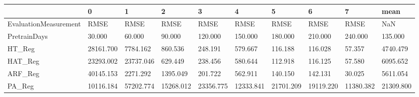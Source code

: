 \begin{tabular}{llllllllll}
\toprule
{} &         0 &         1 &         2 &         3 &         4 &         5 &         6 &         7 &      mean \\
\midrule
EvaluationMeasurement &      RMSE &      RMSE &      RMSE &      RMSE &      RMSE &      RMSE &      RMSE &      RMSE &       NaN \\
PretrainDays          &    30.000 &    60.000 &    90.000 &   120.000 &   150.000 &   180.000 &   210.000 &   240.000 &   135.000 \\
HT\_Reg                & 28161.700 &  7784.162 &   860.536 &   248.191 &   579.667 &   116.188 &   116.028 &    57.357 &  4740.479 \\
HAT\_Reg               & 23293.002 & 23737.046 &   629.449 &   238.456 &   580.644 &   112.918 &   116.125 &    57.580 &  6095.652 \\
ARF\_Reg               & 40145.153 &  2271.292 &  1395.049 &   201.722 &   562.911 &   140.150 &   142.131 &    30.025 &  5611.054 \\
PA\_Reg                & 10116.184 & 57202.774 & 15268.012 & 23356.775 & 12333.841 & 21701.209 & 19119.220 & 11380.382 & 21309.800 \\
\bottomrule
\end{tabular}

